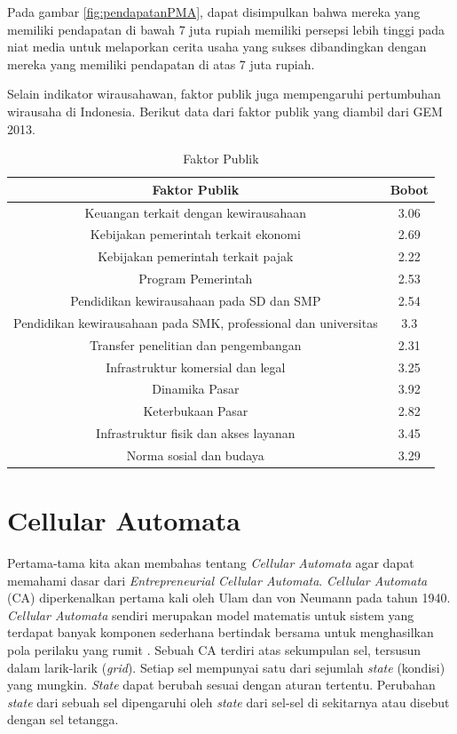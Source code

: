 \begin{enumerate}
Pada gambar \ref{fig:pendapatanPMA}, dapat disimpulkan bahwa mereka yang memiliki pendapatan di bawah 7 juta rupiah memiliki persepsi lebih tinggi pada niat media untuk melaporkan cerita usaha yang sukses dibandingkan dengan mereka yang memiliki pendapatan di atas 7 juta rupiah.
\end{enumerate}

Selain indikator wirausahawan, faktor publik juga mempengaruhi pertumbuhan wirausaha di Indonesia. Berikut data dari faktor publik yang diambil dari GEM 2013.
\begin{table} [H]
\centering
\caption{Faktor Publik}
\begin{tabular}{|c|c|}
\hline
Faktor Publik & Bobot\\
\hline
Keuangan terkait dengan kewirausahaan & 3.06 \\
\hline
Kebijakan pemerintah terkait ekonomi & 2.69 \\
\hline
Kebijakan pemerintah terkait pajak & 2.22 \\
\hline
Program Pemerintah & 2.53\\
\hline
Pendidikan kewirausahaan pada SD dan SMP & 2.54\\
\hline
Pendidikan kewirausahaan pada SMK, professional dan universitas & 3.3\\
\hline
Transfer penelitian dan pengembangan & 2.31\\
\hline
Infrastruktur komersial dan legal & 3.25\\
\hline
Dinamika Pasar & 3.92\\
\hline
Keterbukaan Pasar & 2.82\\
\hline
Infrastruktur fisik dan akses layanan & 3.45\\
\hline 
Norma sosial dan budaya & 3.29\\
\hline
\end{tabular}
\label{dataPublik}
\end{table}

\section{Cellular Automata}
\label{sec:cellularautomata}

Pertama-tama kita akan membahas tentang \textit{Cellular Automata} agar dapat memahami dasar dari \textit{Entrepreneurial Cellular Automata}. \textit{Cellular Automata} (CA)  diperkenalkan pertama kali oleh Ulam dan von Neumann pada tahun 1940. \textit{Cellular Automata} sendiri merupakan model matematis untuk sistem yang terdapat banyak komponen sederhana bertindak bersama untuk menghasilkan pola perilaku yang rumit \cite{referensiCA2}. Sebuah CA terdiri atas sekumpulan sel, tersusun dalam larik-larik (\textit{grid}). Setiap sel mempunyai satu dari sejumlah \textit{state} (kondisi) yang mungkin. \textit{State} dapat berubah sesuai dengan aturan tertentu. Perubahan \textit{state} dari sebuah sel dipengaruhi oleh \textit{state} dari sel-sel di sekitarnya atau disebut dengan sel tetangga.

